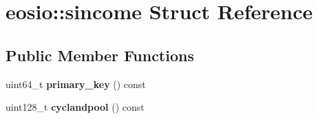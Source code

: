 \hypertarget{structeosio_1_1sincome}{}\section{eosio\+:\+:sincome Struct Reference}
\label{structeosio_1_1sincome}
\subsection*{Public Member Functions}
\begin{DoxyCompactItemize}
\item 
\mbox{\label{structeosio_1_1sincome_a3991414ccc6f79d3c1ecc21a1b9110c1}} 
uint64\+\_\+t {\bfseries primary\+\_\+key} () const
\item 
\mbox{\label{structeosio_1_1sincome_a726b89824c88582102c4db97824e61ca}} 
uint128\+\_\+t {\bfseries cyclandpool} () const
\end{DoxyCompactItemize}
